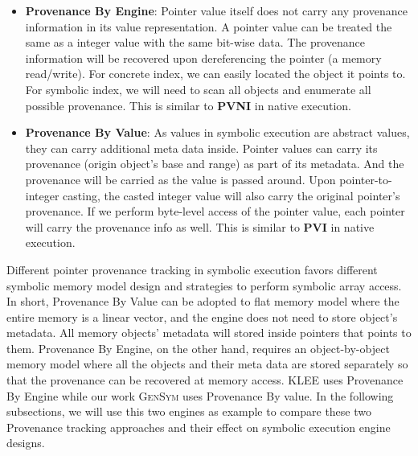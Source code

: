 \documentclass[sigplan, nonacm]{acmart}\settopmatter{printfolios=true,printccs=false,printacmref=false}
\newcommand{\tool}{\textsc{GenSym}\xspace}
\newcommand{\klee}{\textsc{KLEE}\xspace}
\begin{document}
\begin{itemize}
  \item \textbf{Provenance By Engine}: Pointer value itself does not carry any provenance information in its value representation. A pointer value can be treated the same as a integer value with the same bit-wise data. The provenance information will be recovered upon dereferencing the pointer (a memory read/write). For concrete index, we can easily located the object it points to. For symbolic index, we will need to scan all objects and enumerate all possible provenance. This is similar to \textbf{PVNI} in native execution.
  \item \textbf{Provenance By Value}: As values in symbolic execution are abstract values, they can carry additional meta data inside. Pointer values can carry its provenance (origin object's base and range) as part of its metadata. And the provenance will be carried as the value is passed around. Upon pointer-to-integer casting, the casted integer value will also carry the original pointer's provenance. If we perform byte-level access of the pointer value, each pointer will carry the provenance info as well. This is similar to \textbf{PVI} in native execution.
\end{itemize}
Different pointer provenance tracking in symbolic execution favors different symbolic memory model design and strategies to perform symbolic array access. In short, Provenance By Value can be adopted to flat memory model where the entire memory is a linear vector, and the engine does not need to store object's metadata. All memory objects' metadata will stored inside pointers that points to them.  Provenance By Engine, on the other hand, requires an object-by-object memory model where all the objects and their meta data are stored separately so that the provenance can be recovered at memory access. \klee uses Provenance By Engine while our work \tool uses Provenance By value. In the following subsections, we will use this two engines as example to compare these two Provenance tracking approaches and their effect on symbolic execution engine designs.
\end{document}
